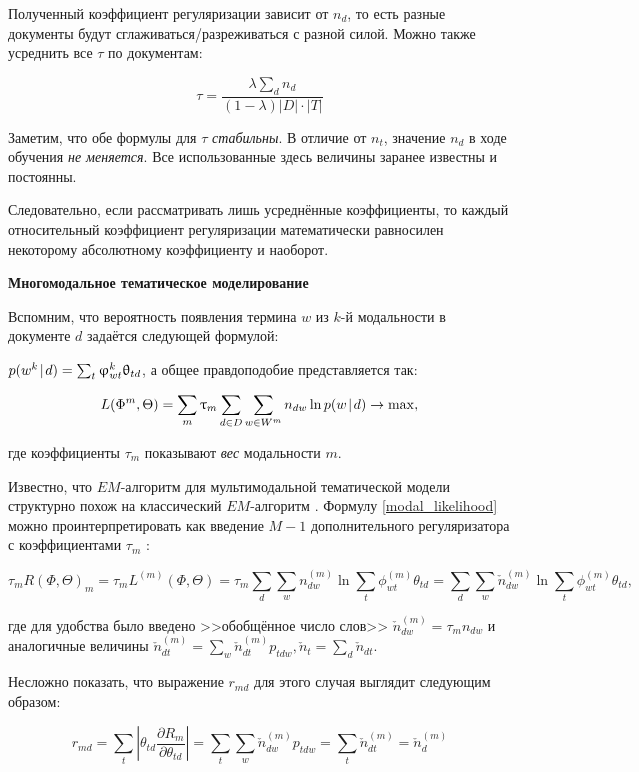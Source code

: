 Полученный коэффициент регуляризации зависит от $n_d$, то есть разные документы будут сглаживаться/разреживаться с разной силой. Можно также усреднить все $\tau$ по документам:

\[
\tau = \frac{\lambda \sum_d n_d }{(1-\lambda) |D| \cdot |T|}
\]

Заметим, что обе формулы для $\tau$ \textit{стабильны}. В отличие от $n_t$, значение $n_d$ в ходе обучения \emph{не меняется}. Все использованные здесь величины заранее известны и постоянны.

Следовательно, если рассматривать лишь усреднённые коэффициенты, то каждый относительный коэффициент регуляризации математически равносилен некоторому абсолютному коэффициенту и наоборот.

\textbf{Многомодальное тематическое моделирование}

Вспомним, что вероятность появления термина $w$ из $k$-й модальности в документе $d$ задаётся следующей формулой:

$p(w^k \mspace{2mu}{|}\mspace{2mu} d) = \sum_t \upvarphi_{wt}^k \uptheta_{td}$, а общее правдоподобие представляется так:

\[
L(\Phi^m, \Theta) = \sum_m \uptau_m \sum_{d\in D} \sum_{w \in W^m} n_{dw} \ln p(w \mspace{2mu}{|}\mspace{2mu} d) \rightarrow \max, \label{modal_likelihood}
\]

где коэффициенты $\tau_m$ показывают \textit{вес} модальности $m$.

Известно, что $EM$-алгоритм для мультимодальной тематической модели структурно похож на классический $EM$-алгоритм \cite{voron15nonbayesian}. Формулу \ref{modal_likelihood} можно проинтерпретировать как введение $M-1$ дополнительного регуляризатора с коэффициентами $\tau_m$ \cite{voron15nonbayesian}:

\[
\tau_m R(\Phi, \Theta)_m = \tau_m L^{(m)}(\Phi, \Theta) = \tau_m  \sum_d \sum_w n_{dw}^{(m)} \ln \sum_t \phi_{wt}^{(m)}\theta_{td} =
\sum_d \sum_w \check{n}_{dw}^{(m)} \ln \sum_t \phi_{wt}^{(m)}\theta_{td},
\]

где для удобства было введено >>обобщённое число слов>> $\check{n}_{dw}^{(m)} = \tau_m n_{dw}$ и аналогичные величины $\check{n}_{dt}^{(m)} = \sum_w \check{n}_{dt}^{(m)} p_{tdw}, \check{n}_t = \sum_d \check{n}_{dt}$.

Несложно показать, что выражение $r_{md}$ для этого случая выглядит следующим образом:

\[
r_{md} = \sum_t |\theta_{td} \frac{\partial R_m}{\partial \theta_{td}}| = \sum_t \sum_w \check{n}_{dw}^{(m)} p_{tdw} = \sum_t  \check{n}_{dt}^{(m)} = \check{n}_{d}^{(m)}
\]

